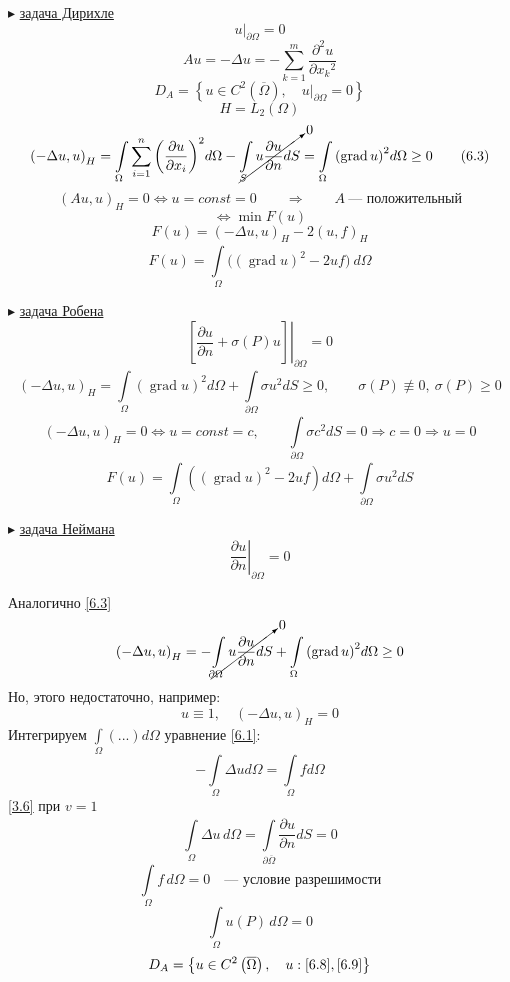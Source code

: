 \documentclass[12pt, a4paper]{article}
\newcommand{\Int}{\int\limits}
\newcommand{\Sum}{\sum\limits}
\begin{document}
$ \blacktriangleright $ \underline{задача Дирихле}
\[ u|_{\partial \Omega} = 0 \label{6.2} \tag{6.2}  \]
\[ A u = - \Delta u = - \Sum_{k=1}^{m } \frac{\partial^2 u }{\partial {x_k}^2} \]
\[ D_A = \left\{ u \in C^2 \left(\overline{\Omega}\right), \quad u |_{\partial \Omega} = 0 \right\} \]
\[ H = L_2 (\Omega) \]
\[ {(-\Delta u, u )}_H = \Int_{\Omega}^{} \Sum_{i=1}^{n} {\left(\frac{\partial u }{\partial x_i}\right)}^2 d \Omega - \cancelto{0}{\int\limits_{S }^{} u \frac{\partial u }{\partial n } dS} = \Int_{\Omega}^{} {(\operatorname{grad} u)}^2 d\Omega \geq 0 \label{6.3} \tag{6.3} \]
\[ {(Au, u)}_H = 0 \Leftrightarrow u = const = 0 \qquad \Rightarrow \qquad A \ \text{--- положительный} \]
\[ \Leftrightarrow \min F(u) \]
\[ F(u) = {(-\Delta u, u )}_H - 2 {(u, f)}_H \label{6.4} \tag{6.4} \]
\[ F(u) = \Int_{\Omega }^{} {((\operatorname{grad} u )}^2 - 2uf) \ d\Omega \label{6.5} \tag{6.5} \]

$ \blacktriangleright $ \underline{задача Робена}
\[ {\left. \left[\frac{\partial u }{\partial n} + \sigma (P) u \right] \right|}_{\partial \Omega} = 0 \label{6.6} \tag{6.6} \]
\[ {(- \Delta u, u)}_H = \Int_{\Omega}^{} {(\operatorname{grad} u)}^2 d\Omega + \Int_{\partial \Omega} \sigma u^2 dS \geq 0, \qquad \sigma(P) \not\equiv 0, \ \sigma(P) \geq 0 \]
\[ {(-\Delta u, u)}_H =0 \Leftrightarrow u = const = c, \qquad \Int_{ \partial \Omega}^{} \sigma c^2 dS = 0 \Rightarrow c = 0 \Rightarrow u = 0\]
\[ F(u) = \Int_{\Omega}^{} \left({(\operatorname{grad} u)}^2 - 2uf \right) d\Omega + \Int_{\partial \Omega} \sigma u^2 dS \label{6.7} \tag{6.7} \]

$ \blacktriangleright $ \underline{задача Неймана}
\[ {\left. \frac{\partial u }{\partial n} \right|}_{\partial \Omega } = 0 \label{6.8} \tag{6.8} \]

Аналогично \eqref{6.3}
\[ {(-\Delta u, u )}_H = - \cancelto{0}{\Int_{\partial \Omega}^{} u  \frac{\partial u}{\partial n} dS} + \Int_{\Omega}^{} {(\operatorname{grad} u )}^2 d\Omega \geq 0 \]
Но, этого недостаточно, например:
\[ u \equiv 1, \quad {(-\Delta u, u)}_H = 0 \]
Интегрируем $\Int_{\Omega} (...) d \Omega $ уравнение \eqref{6.1}:
\[ - \Int_{\Omega} \Delta u d \Omega = \Int_{\Omega} f d \Omega \]
\eqref{3.6} при $v = 1$
\[ \Int_{\Omega }^{} \Delta u \, d\Omega = \Int_{\partial \overline{\Omega}}^{} \frac{\partial u }{\partial n } dS = 0 \]
\[ \Int_{\Omega} f \, d\Omega = 0 \quad \text{--- условие разрешимости} \]
\[ \Int_{\Omega} u(P) \, d\Omega = 0 \label{6.9} \tag{6.9} \]
\[ D_A = \left\{ u \in C^2 \left(\overline{\Omega}\right), \quad u: \eqref{6.8}, \eqref{6.9} \right\} \]
\end{document}
